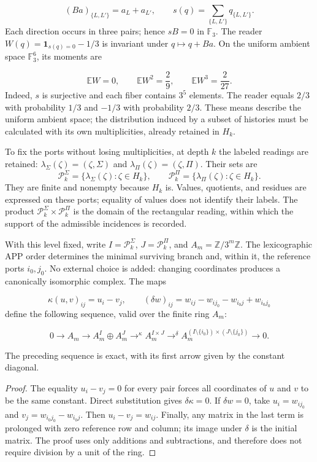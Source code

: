 \[
(Ba)_{\{L,L'\}}=a_L+a_{L'},
\qquad
s(q)=\sum_{\{L,L'\}}q_{\{L,L'\}}.
\]
Each direction occurs in three pairs; hence \(sB=0\) in \(\mathbb F_3\). The reader \(W(q)=\mathbf1_{s(q)=0}-1/3\) is invariant under \(q\mapsto q+Ba\). On the uniform ambient space \(\mathbb F_3^6\), its moments are

\[
\mathbb EW=0,\qquad
\mathbb EW^2=\frac29,\qquad
\mathbb EW^3=\frac2{27}.
\]
Indeed, \(s\) is surjective and each fiber contains \(3^5\) elements. The reader equals \(2/3\) with probability \(1/3\) and \(-1/3\) with probability \(2/3\). These means describe the uniform ambient space; the distribution induced by a subset of histories must be calculated with its own multiplicities, already retained in \(H_k\).

To fix the ports without losing multiplicities, at depth \(k\) the
labeled readings are retained:
\(\lambda_\Sigma(\zeta)=(\zeta,\Sigma)\) and
\(\lambda_\Pi(\zeta)=(\zeta,\Pi)\). Their sets are
\[
\mathscr P_k^\Sigma=\{\lambda_\Sigma(\zeta):\zeta\in H_k\},\qquad
\mathscr P_k^\Pi=\{\lambda_\Pi(\zeta):\zeta\in H_k\}.
\]
They are finite and nonempty because \(H_k\) is. Values, quotients, and residues
are expressed on these ports; equality of values does not identify their
labels. The product \(\mathscr P_k^\Sigma\times\mathscr P_k^\Pi\) is the
domain of the rectangular reading, within which the support of the
admissible incidences is recorded.

With this level fixed, write \(I=\mathscr P_k^\Sigma\),
\(J=\mathscr P_k^\Pi\), and \(A_m=\mathbb Z/3^m\mathbb Z\). The
lexicographic APP order determines the minimal surviving branch and, within it, the
reference ports \(i_0,j_0\). No external choice is added: changing
coordinates produces a canonically isomorphic complex. The maps

\[
\kappa(u,v)_{ij}=u_i-v_j,
\qquad
(\delta w)_{ij}=w_{ij}-w_{ij_0}-w_{i_0j}+w_{i_0j_0}
\]
define the following sequence, valid over the finite ring \(A_m\):

\[
0\longrightarrow A_m\longrightarrow
A_m^I\oplus A_m^J\mathrel{\mathop{\longrightarrow}^{\kappa}}
A_m^{I\times J}\mathrel{\mathop{\longrightarrow}^{\delta}}
A_m^{(I\setminus\{i_0\})\times(J\setminus\{j_0\})}
\longrightarrow0.
\]
\begin{proposition}
\label{act21:prop:continuo-exactitud-rectangular}
The preceding sequence is exact, with its first arrow given by the constant diagonal.
\end{proposition}
\begin{proof}
The equality \(u_i-v_j=0\) for every pair forces all coordinates of \(u\) and \(v\) to be the same constant. Direct substitution gives \(\delta\kappa=0\). If \(\delta w=0\), take \(u_i=w_{ij_0}\) and \(v_j=w_{i_0j_0}-w_{i_0j}\). Then \(u_i-v_j=w_{ij}\). Finally, any matrix in the last term is prolonged with zero reference row and column; its image under \(\delta\) is the initial matrix. The proof uses only additions and subtractions, and therefore does not require division by a unit of the ring.
\end{proof}

